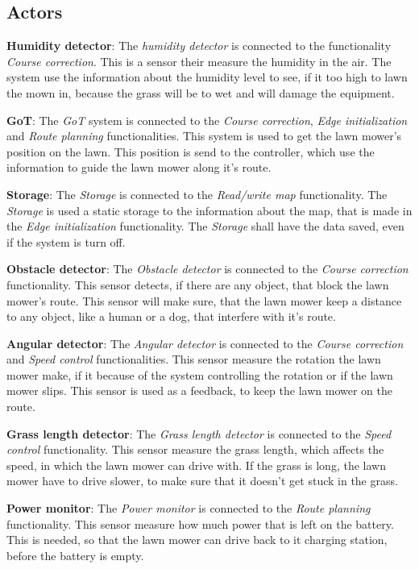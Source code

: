 \subsection{Actors}

\textbf{Humidity detector}:
The \textit{humidity detector} is connected to the functionality \textit{Course correction}. This is a sensor their measure the humidity in the air. The system use the information about the humidity level to see, if it too high to lawn the mown in, because the grass will be to wet and will damage the equipment. 

\textbf{GoT}:
The \textit{GoT} system is connected to the \textit{Course correction}, \textit{Edge initialization} and \textit{Route planning} functionalities. This system is used to get the lawn mower's position on the lawn. This position is send to the controller, which use the information to guide the lawn mower along it's route.

\textbf{Storage}:
The \textit{Storage} is connected to the \textit{Read/write map} functionality. The \textit{Storage} is used a static storage to the information about the map, that is made in the \textit{Edge initialization} functionality. The \textit{Storage} shall have the data saved, even if the system is turn off.

\textbf{Obstacle detector}:
The \textit{Obstacle detector} is connected to the \textit{Course correction} functionality. This sensor detects, if there are any object, that block the lawn mower's route. This sensor will make sure, that the lawn mower keep a distance to any object, like a human or a dog, that interfere with it's route.

\textbf{Angular detector}:
The \textit{Angular detector} is connected to the \textit{Course correction} and \textit{Speed control} functionalities. This sensor measure the rotation the lawn mower make, if it because of the system controlling the rotation or if the lawn mower slips. This sensor is used as a feedback, to keep the lawn mower on the route.

\textbf{Grass length detector}:
The \textit{Grass length detector} is connected to the \textit{Speed control} functionality. This sensor measure the  grass length, which affects the speed, in which the lawn mower can drive with. If the grass is long, the lawn mower have to drive slower, to make sure that it doesn't get stuck in the grass. 

\textbf{Power monitor}:
The \textit{Power monitor} is connected to the \textit{Route planning} functionality. This sensor measure how much power that is left on the battery. This is needed, so that the lawn mower can drive back to it charging station, before the battery is empty.





